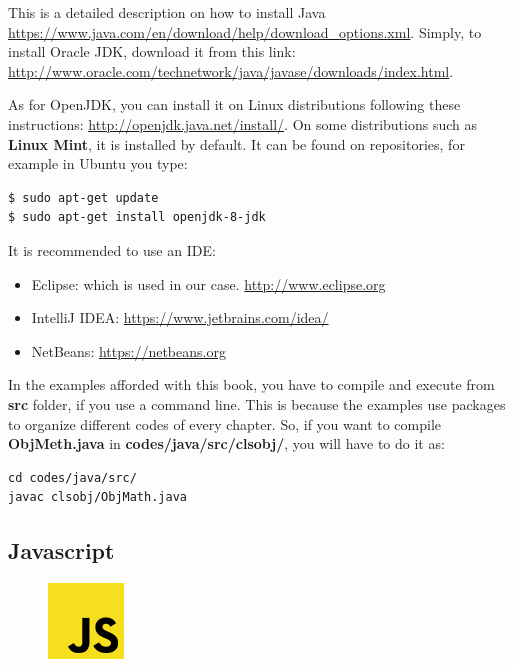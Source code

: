 \documentclass{KodeBook}
\begin{document}
This is a detailed description on how to install Java \url{https://www.java.com/en/download/help/download_options.xml}.
Simply, to install Oracle JDK, download it from this link: \url{http://www.oracle.com/technetwork/java/javase/downloads/index.html}. 

As for OpenJDK, you can install it on Linux distributions following these instructions: \url{http://openjdk.java.net/install/}. 
On some distributions such as \textbf{Linux Mint}, it is installed by default.
It can be found on repositories, for example in Ubuntu you type:
\begin{lstlisting}[style=shellStyle]
$ sudo apt-get update
$ sudo apt-get install openjdk-8-jdk
\end{lstlisting}

It is recommended to use an IDE:
\begin{itemize}
	\item Eclipse: which is used in our case. \url{http://www.eclipse.org}
	\item IntelliJ IDEA: \url{https://www.jetbrains.com/idea/}
	\item NetBeans: \url{https://netbeans.org}
\end{itemize}

In the examples afforded with this book, you have to compile and execute from \textbf{src} folder, if you use a command line. 
This is because the examples use packages to organize different codes of every chapter. 
So, if you want to compile \textbf{ObjMeth.java} in \textbf{codes/java/src/clsobj/}, you will have  to do it as:
\begin{lstlisting}[style=shellStyle]
cd codes/java/src/
javac clsobj/ObjMath.java 
\end{lstlisting}

\subsection{Javascript}

\begin{figure}
	\centering
	\vspace{-20pt}
	\includegraphics[width=2cm]{../img/Javascript.pdf}
\end{figure}
\end{document}
